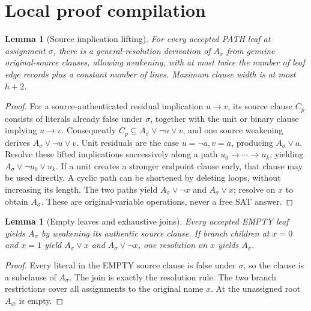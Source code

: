 \documentclass[11pt]{article}
\newtheorem{lemma}[theorem]{Lemma}
\begin{document}
\section{Local proof compilation}
\begin{lemma}[Source implication lifting]\label{lem:path}
For every accepted PATH leaf at assignment \(\sigma\), there is a general-resolution derivation of \(A_\sigma\) from genuine original-source clauses, allowing weakening, with at most twice the number of leaf edge records plus a constant number of lines. Maximum clause width is at most \(h+2\).
\end{lemma}
\begin{proof}
For a source-authenticated residual implication \(u\to v\), its source clause \(C_p\) consists of literals already false under \(\sigma\), together with the unit or binary clause implying \(u\to v\). Consequently \(C_p\subseteq A_\sigma\vee\neg u\vee v\), and one source weakening derives \(A_\sigma\vee\neg u\vee v\). Unit residuals are the case \(u=\neg a,v=a\), producing \(A_\sigma\vee a\). Resolve these lifted implications successively along a path \(u_0\to\cdots\to u_k\), yielding \(A_\sigma\vee\neg u_0\vee u_k\). If a unit creates a stronger endpoint clause early, that clause may be used directly. A cyclic path can be shortened by deleting loops, without increasing its length. The two paths yield \(A_\sigma\vee\neg x\) and \(A_\sigma\vee x\); resolve on \(x\) to obtain \(A_\sigma\). These are original-variable operations, never a free SAT answer.
\end{proof}

\begin{lemma}[Empty leaves and exhaustive joins]\label{lem:join}
Every accepted EMPTY leaf yields \(A_\sigma\) by weakening its authentic source clause. If branch children at \(x=0\) and \(x=1\) yield \(A_\sigma\vee x\) and \(A_\sigma\vee\neg x\), one resolution on \(x\) yields \(A_\sigma\).
\end{lemma}
\begin{proof}
Every literal in the EMPTY source clause is false under \(\sigma\), so the clause is a subclause of \(A_\sigma\). The join is exactly the resolution rule. The two branch restrictions cover all assignments to the original name \(x\). At the unassigned root \(A_\varnothing\) is empty.
\end{proof}
\end{document}
